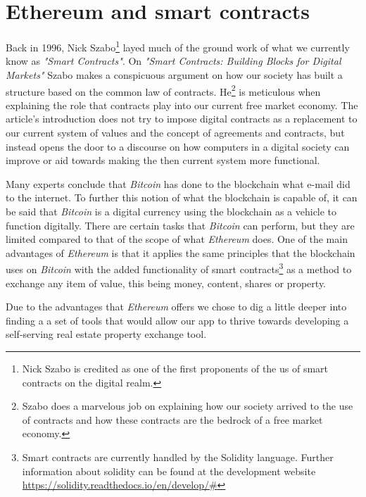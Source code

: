 \documentclass[submission,copyright,creativecommons]{eptcs}
\begin{document}
\section{Ethereum and smart contracts}
Back in 1996, Nick Szabo\footnote{Nick Szabo is credited as one of the first proponents of the us of smart contracts on the digital realm.} layed much of the ground work of what we currently know as \textit{"Smart Contracts"}.  On \textit{"Smart Contracts: Building Blocks for Digital Markets"}\cite{NickSzaboSmart} Szabo makes a conspicuous argument on how our society has built a structure based on the common law of contracts.  He\footnote{Szabo does a marvelous job on explaining how our society arrived to the use of contracts and how these contracts are the bedrock of a free market economy.} is meticulous when explaining the role that contracts play into our current free market economy.  The article's introduction does not try to impose digital contracts as a replacement to our current system of values and the concept of agreements and contracts, but instead opens the door to a discourse on how computers in a digital society can improve or aid towards making the then current system more functional.

Many experts conclude that \textit{Bitcoin} has done to the blockchain what e-mail did to the internet.  To further this notion of what the blockchain is capable of, it can be said that \textit{Bitcoin} is a digital currency using the blockchain as a vehicle to function digitally.  There are certain tasks that \textit{Bitcoin} can perform, but they are limited compared to that of the scope of what \textit{Ethereum} does.  One of the main advantages of \textit{Ethereum} is that it applies the same principles that the blockchain uses on \textit{Bitcoin} with the added functionality of smart contracts\footnote{Smart contracts are currently handled by the Solidity language.  Further information about solidity can be found at the development website \url{https://solidity.readthedocs.io/en/develop/#}\cite{SoliditySolidity23}} as a method to exchange any item of value, this being money, content, shares or property.

Due to the advantages that \textit{Ethereum} offers we chose to dig a little deeper into finding a a set of tools that would allow our app to thrive towards developing a self-serving real estate property exchange tool.
\end{document}

